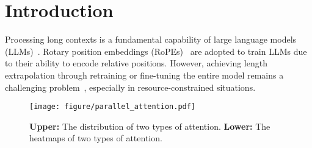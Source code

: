 \vspace{-20pt}

\section{Introduction}
\label{intro}
\vspace{-2pt} 

Processing long contexts is a fundamental capability of large language models (LLMs)~\citep{achiam2023gpt, touvron2023llama, dubey2024llama}. Rotary position embeddings (RoPEs)~\citep{rerope2023} are adopted to train LLMs due to their ability to encode relative positions. However, achieving length extrapolation through retraining or fine-tuning the entire model remains a challenging problem~\citep{alibi,chi2022kerple, peng2023yarn, fu2024data}, especially in resource-constrained situations. 



\begin{figure}[t]
\vskip 0.2in
\begin{center}
\centerline{\texttt{[image: figure/parallel\_attention.pdf]}}
\caption{\textbf{Upper:} The distribution of two types of attention. \textbf{Lower:} The heatmaps of two types of attention.}
\label{fig:parallel_attenion_overview}
\end{center}
\vspace{-6mm}
\end{figure}



